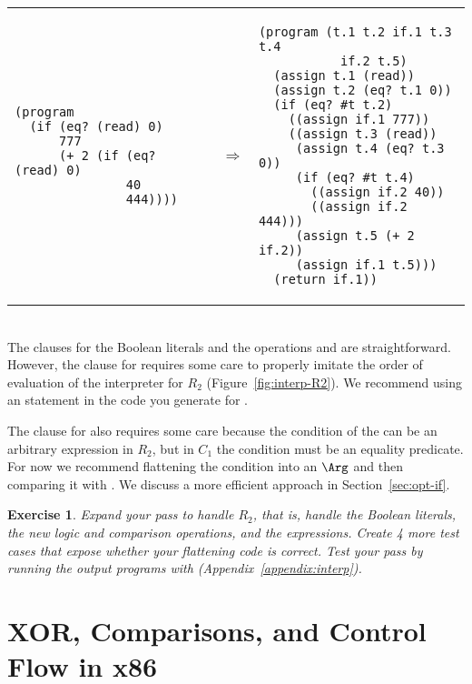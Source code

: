 \documentclass[11pt]{book}
\newtheorem{exercise}[theorem]{Exercise}
\begin{document}
\begin{tabular}{lll}
\begin{minipage}{0.4\textwidth}
\begin{lstlisting}
(program
  (if (eq? (read) 0)
      777
      (+ 2 (if (eq? (read) 0)
               40
               444))))
\end{lstlisting}
\end{minipage}
&
$\Rightarrow$
&
\begin{minipage}{0.4\textwidth}
\begin{lstlisting}
(program (t.1 t.2 if.1 t.3 t.4
           if.2 t.5)
  (assign t.1 (read))
  (assign t.2 (eq? t.1 0))
  (if (eq? #t t.2)
    ((assign if.1 777))
    ((assign t.3 (read))
     (assign t.4 (eq? t.3 0))
     (if (eq? #t t.4)
       ((assign if.2 40))
       ((assign if.2 444)))
     (assign t.5 (+ 2 if.2))
     (assign if.1 t.5)))
  (return if.1))
\end{lstlisting}
\end{minipage}
\end{tabular} \\

The  clauses for the Boolean literals and the operations
 and  are straightforward.  However, the
 clause for  requires some care to properly
imitate the order of evaluation of the interpreter for $R_2$
(Figure~\ref{fig:interp-R2}). We recommend using an  statement
in the code you generate for .

The  clause for  also requires some care because
the condition of the  can be an arbitrary expression in $R_2$,
but in $C_1$ the condition must be an equality predicate. For now we
recommend flattening the condition into an $\Arg$ and then comparing
it with . We discuss a more efficient approach in
Section~\ref{sec:opt-if}.


\begin{exercise}\normalfont
Expand your  pass to handle $R_2$, that is, handle the
Boolean literals, the new logic and comparison operations, and the
 expressions. Create 4 more test cases that expose whether
your flattening code is correct. Test your  pass by
running the output programs with 
(Appendix~\ref{appendix:interp}).
\end{exercise}


\section{XOR, Comparisons, and Control Flow in x86}
\label{sec:x86-1}
\end{document}
